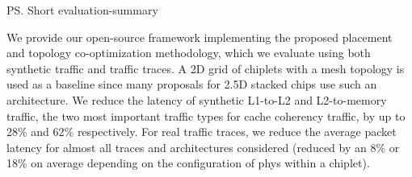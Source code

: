 \ps{Short evaluation-summary}

We provide our open-source framework implementing the proposed placement and topology co-optimization methodology, which we evaluate using both synthetic traffic and traffic traces.
A 2D grid of chiplets with a mesh topology is used as a baseline since many proposals for 2.5D stacked chips \cite{dataflow_accel_dnn, cifher, simba, hecaton, dojo} use such an architecture.
We reduce the latency of synthetic L1-to-L2 and L2-to-memory traffic, the two most important traffic types for cache coherency traffic, by up to 28\% and 62\% respectively.
For real traffic traces, we reduce the average packet latency for almost all traces and architectures considered (reduced by an 8\% or 18\% on average depending on the configuration of \gls{phys} within a chiplet).
